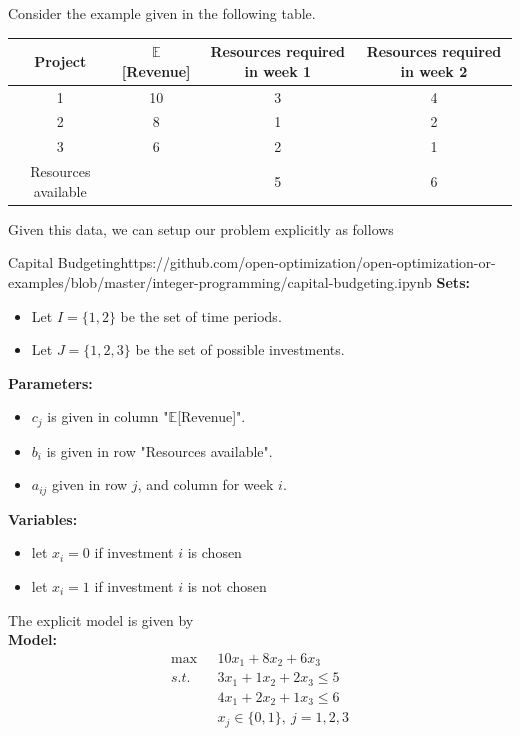 \newpage
Consider the example given in the following table.
	\begin{table}[h]
			\begin{tabular}{|c|c|c|c|}%
				\hline
				Project & $\mathbb{E}$[Revenue] & Resources required in week 1 & Resources required in week 2\\\hline
				\rowcolor{gray!10} 1 & 10 & 3 & 4\\
				\hline
				2 & 8 & 1 & 2\\\hline
				\rowcolor{gray!10} 3 & 6 & 2 & 1\\
				\hline
				Resources available & & 5 & 6\\
				\hline
		\end{tabular}
	\end{table}


Given this data, we can setup our problem explicitly as follows

\begin{examplewithallcode}{Capital Budgeting}{}{https://github.com/open-optimization/open-optimization-or-examples/blob/master/integer-programming/capital-budgeting.ipynb}{}
\noindent \textbf{Sets:}
\begin{itemize}
\item Let $I = \{1,2\}$ be the set of time periods.
\item Let $J = \{1, 2,3\}$ be the set of possible investments.
\end{itemize}

\noindent \textbf{Parameters:}
\begin{itemize}
\item $c_j$ is given in column "$\mathbb{E}$[Revenue]".
\item $b_i$ is given in row "Resources available".
\item $a_{ij}$ given in row $j$, and column for week $i$.
\end{itemize}

\noindent \textbf{Variables:}
\begin{itemize}
\item let $x_i = 0$ if investment $i$ is chosen
\item let $x_i = 1$ if investment $i$ is not chosen
\end{itemize}

The explicit model is given by\\
\noindent  \textbf{Model:}
\begin{align*}
	\max\ \ \  & 10x_1+8x_2+6x_3 \tag{Total Expected Revenue}\\
	s.t. \ \ & 
	3x_1+1x_2+2x_3\leq5 \tag{ Resource constraint week 1}\\
	&4x_1+2x_2+1x_3\leq6 \tag{ Resource constraint week 2}\\
&x_j \in \{0,1\},\  j = 1,2,3
\end{align*}

\end{examplewithallcode}
